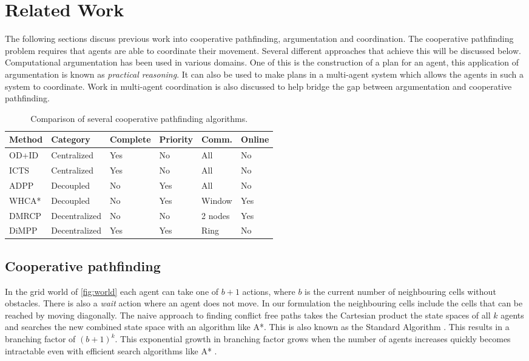 \section{Related Work}\label{sec:related}
The following sections discuss previous work into cooperative pathfinding,
argumentation and coordination. The cooperative pathfinding problem requires
that agents are able to coordinate their movement. Several different approaches
that achieve this will be discussed below. Computational argumentation has been
used in various domains. One of this is the construction of a plan for an agent,
this application of argumentation is known as \emph{practical reasoning}. It 
can also be used to make plans in a multi-agent system which allows the agents 
in such a system to coordinate. Work in multi-agent coordination is also 
discussed to help bridge the gap between argumentation and cooperative 
pathfinding.

\begin{table*}[h]
    \centering
    \caption{Comparison of several cooperative pathfinding algorithms.}
    \label{tbl:planning-overview}
    \begin{tabular}{l|l|l|l|l|l}
        Method & Category & Complete & Priority & Comm. & Online \\
        \hline
        OD+ID \citep{standley2010,standley2011} & Centralized & Yes & No & All &
        No \\
        ICTS \citep{sharon2013} & Centralized & Yes & No & All & No \\
        ADPP \citep{cap2012} & Decoupled & No & Yes & All & No \\
        WHCA* \citep{silver2005} & Decoupled & No & Yes & Window
        & Yes \\
		DMRCP \citep{wei2016} & Decentralized & No & No & 2 nodes & Yes \\
        DiMPP \citep{chouhan2017} & Decentralized & Yes & Yes & Ring & No \\
    \end{tabular}
\end{table*}

\subsection{Cooperative pathfinding}
In the grid world of \autoref{fig:world} each agent can take one of $b+1$
actions, where $b$ is the current number of neighbouring cells without
obstacles. There is also a \textit{wait} action where an agent does not move. 
In our formulation the neighbouring cells include the cells that can be reached
by moving diagonally. The naive approach to finding conflict free paths takes
the Cartesian product the state spaces of all $k$ agents and searches the new
combined state space with an algorithm like A*. This is also known as the
Standard Algorithm \citep{standley2010}. This results in a branching factor of
$(b+1)^k$. This exponential growth in branching factor grows when the number of 
agents increases quickly becomes intractable even with efficient search 
algorithms like A* \citep{sharon2013}.


